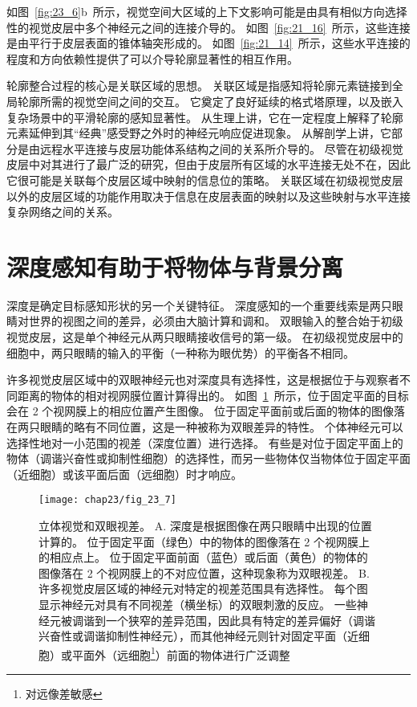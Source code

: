 如图~\ref{fig:23_6}b~所示，视觉空间大区域的上下文影响可能是由具有相似方向选择性的视觉皮层中多个神经元之间的连接介导的。
如图~\ref{fig:21_16}~所示，这些连接是由平行于皮层表面的锥体轴突形成的。
如图~\ref{fig:21_14}~所示，这些水平连接的程度和方向依赖性提供了可以介导轮廓显著性的相互作用。


轮廓整合过程的核心是关联区域的思想。
关联区域是指感知将轮廓元素链接到全局轮廓所需的视觉空间之间的交互。
它奠定了良好延续的格式塔原理，以及嵌入复杂场景中的平滑轮廓的感知显著性。
从生理上讲，它在一定程度上解释了轮廓元素延伸到其“经典”感受野之外时的神经元响应促进现象。
从解剖学上讲，它部分是由远程水平连接与皮层功能体系结构之间的关系所介导的。
尽管在初级视觉皮层中对其进行了最广泛的研究，但由于皮层所有区域的水平连接无处不在，因此它很可能是关联每个皮层区域中映射的信息位的策略。
关联区域在初级视觉皮层以外的皮层区域的功能作用取决于信息在皮层表面的映射以及这些映射与水平连接复杂网络之间的关系。



\section{深度感知有助于将物体与背景分离}

深度是确定目标感知形状的另一个关键特征。
深度感知的一个重要线索是两只眼睛对世界的视图之间的差异，必须由大脑计算和调和。
双眼输入的整合始于初级视觉皮层，这是单个神经元从两只眼睛接收信号的第一级。
在初级视觉皮层中的细胞中，两只眼睛的输入的平衡（一种称为眼优势）的平衡各不相同。


许多视觉皮层区域中的双眼神经元也对深度具有选择性，这是根据位于与观察者不同距离的物体的相对视网膜位置计算得出的。
如图~\ref{fig:23_7}~所示，位于固定平面的目标会在 2 个视网膜上的相应位置产生图像。
位于固定平面前或后面的物体的图像落在两只眼睛的略有不同位置，这是一种被称为双眼差异的特性。
个体神经元可以选择性地对一小范围的视差（深度位置）进行选择。
有些是对位于固定平面上的物体（调谐兴奋性或抑制性细胞）的选择性，而另一些物体仅当物体位于固定平面（近细胞）或该平面后面（远细胞）时才响应。


\begin{figure}[htbp]
	\centering
	\texttt{[image: chap23/fig\_23\_7]}
	\caption{立体视觉和双眼视差。
		A. 深度是根据图像在两只眼睛中出现的位置计算的。
		位于固定平面（绿色）中的物体的图像落在 2 个视网膜上的相应点上。
		位于固定平面前面（蓝色）或后面（黄色）的物体的图像落在 2 个视网膜上的不对应位置，这种现象称为双眼视差。
		B. 许多视觉皮层区域的神经元对特定的视差范围具有选择性。
		每个图显示神经元对具有不同视差（横坐标）的双眼刺激的反应。
		一些神经元被调谐到一个狭窄的差异范围，因此具有特定的差异偏好（调谐兴奋性或调谐抑制性神经元），而其他神经元则针对固定平面（近细胞）或平面外（远细胞\footnote{对远像差敏感}）前面的物体进行广泛调整\cite{poggio1995mechanisms}}
	\label{fig:23_7}
\end{figure}



